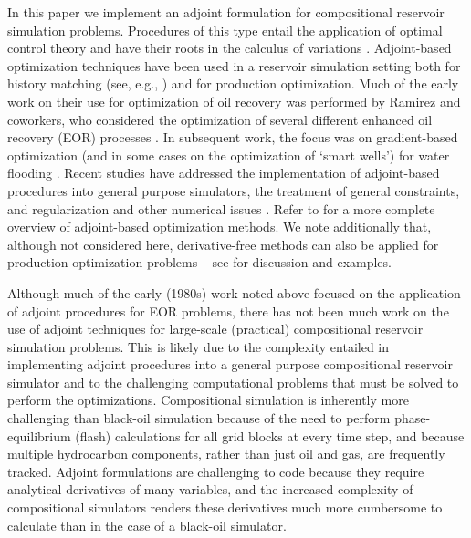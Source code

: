 \documentclass[twocolumn,numbook]{svjour3}          %
\begin{document}
In this paper we implement an adjoint formulation for compositional reservoir
simulation problems. Procedures of this type entail the application of optimal
control theory and have their roots in the calculus of variations
\cite{Bryson:1975,Stengel:1986}. Adjoint-based optimization techniques have been
used in a reservoir simulation setting both for history matching (see, e.g.,
  \cite{Gavalas,Chavent,Li,Oliver,Pallav:2006}) and for production optimization.
Much of the early work on their use for optimization of oil recovery was performed by
Ramirez and coworkers, who considered the optimization of several different
enhanced oil recovery (EOR) processes
\cite{Ramirez:book,Ramirez:1989,Ramirez:1993}. In subsequent work, the focus was
on gradient-based optimization (and in some cases on the optimization of `smart
  wells') for water flooding
\cite{Asheim,Virnovski,Sudaryanto:2000,Brouwer:2004,Pallav:2006}. Recent studies
have addressed the implementation of adjoint-based procedures into general
purpose simulators, the treatment of general constraints, and regularization and
other numerical issues \cite{Pallav:2008,Brouwer:2008,Doublet:2009,CPRA}. Refer
to \cite{Jansen:2011} for a more complete overview of adjoint-based optimization
methods. We note additionally that, although not considered here, derivative-free
methods can also be applied for production optimization problems -- see
\cite{echeverria:2011} for discussion and examples.

Although much of the early (1980s) work noted above focused on the application
of adjoint procedures for EOR problems, there has not been much work on the use
of adjoint techniques for large-scale (practical) compositional reservoir
simulation problems. This is likely due to the complexity entailed in
implementing adjoint procedures into a general purpose compositional reservoir
simulator and to the challenging computational problems that must be solved to
perform the optimizations. Compositional simulation is inherently more
challenging than black-oil simulation because of the need to perform
phase-equilibrium (flash) calculations for all grid blocks at every time step,
and because multiple hydrocarbon components, rather than just oil
and gas, are frequently tracked. Adjoint formulations are challenging to code
because they require analytical derivatives of many variables, and the
increased complexity of compositional simulators renders these derivatives
much more cumbersome to calculate than in the case of a black-oil simulator.
\end{document}
